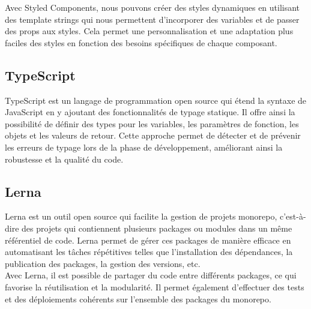 Avec Styled Components, nous pouvons créer des styles dynamiques en utilisant des template strings qui nous permettent d'incorporer des variables et de passer des props aux styles. Cela permet une personnalisation et une adaptation plus faciles des styles en fonction des besoins spécifiques de chaque composant.

\subsection*{TypeScript}
TypeScript est un langage de programmation open source qui étend la syntaxe de JavaScript en y ajoutant des fonctionnalités de typage statique. Il offre ainsi la possibilité de définir des types pour les variables, les paramètres de fonction, les objets et les valeurs de retour. Cette approche permet de détecter et de prévenir les erreurs de typage lors de la phase de développement, améliorant ainsi la robustesse et la qualité du code.

\subsection*{Lerna}
Lerna est un outil open source qui facilite la gestion de projets monorepo, c'est-à-dire des projets qui contiennent plusieurs packages ou modules dans un même référentiel de code. Lerna permet de gérer ces packages de manière efficace en automatisant les tâches répétitives telles que l'installation des dépendances, la publication des packages, la gestion des versions, etc.\\

Avec Lerna, il est possible de partager du code entre différents packages, ce qui favorise la réutilisation et la modularité. Il permet également d'effectuer des tests et des déploiements cohérents sur l'ensemble des packages du monorepo.

